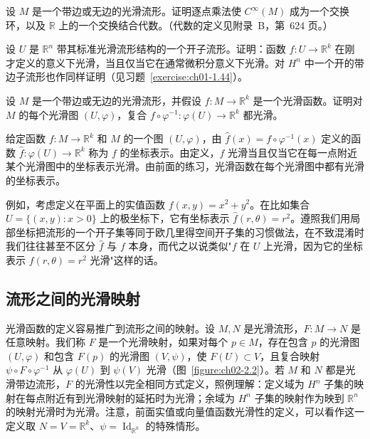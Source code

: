 \documentclass[../../main.tex]{subfiles}
\begin{document}
\begin{exercise}\label{exercise:ch02-2.1}
设 $M$ 是一个带边或无边的光滑流形。证明逐点乘法使 $C^{\infty}(M)$ 成为一个交换环，以及 $\mathbb{R}$ 上的一个交换结合代数。（代数的定义见附录~B，第~624 页。）
\end{exercise}

\begin{exercise}\label{exercise:ch02-2.2}
设 $U$ 是 $\mathbb{R}^{n}$ 带其标准光滑流形结构的一个开子流形。证明：函数 $f:U\to\mathbb{R}^{k}$ 在刚才定义的意义下光滑，当且仅当它在通常微积分意义下光滑。对 $H^{n}$ 中一个开的带边子流形也作同样证明（见习题~\cref{exercise:ch01-1.44}）。
\end{exercise}

\begin{exercise}\label{exercise:ch02-2.3}
设 $M$ 是一个带边或无边的光滑流形，并假设 $f:M\to\mathbb{R}^{k}$ 是一个光滑函数。证明对 $M$ 的每个光滑图 $(U,\varphi)$，复合 $f\circ\varphi^{-1}:\varphi(U)\to\mathbb{R}^{k}$ 都光滑。
\end{exercise}

给定函数 $f:M\to\mathbb{R}^{k}$ 和 $M$ 的一个图 $(U,\varphi)$，由 $\widehat{f}(x)=f\circ\varphi^{-1}(x)$ 定义的函数 $\widehat{f}:\varphi(U)\to\mathbb{R}^{k}$ 称为 $f$ 的坐标表示。由定义，$f$ 光滑当且仅当它在每一点附近某个光滑图中的坐标表示光滑。由前面的练习，光滑函数在每个光滑图中都有光滑的坐标表示。

例如，考虑定义在平面上的实值函数 $f(x,y)=x^{2}+y^{2}$。在比如集合 $U=\{(x,y):x>0\}$ 上的极坐标下，它有坐标表示 $\widehat{f}(r,\theta)=r^{2}$。遵照我们用局部坐标把流形的一个开子集等同于欧几里得空间开子集的习惯做法，在不致混淆时我们往往甚至不区分 $\widehat{f}$ 与 $f$ 本身，而代之以说类似"$f$ 在 $U$ 上光滑，因为它的坐标表示 $f(r,\theta)=r^{2}$ 光滑"这样的话。
\subsection{流形之间的光滑映射}\label{subsection:ch02-流形之间的光滑映射}

光滑函数的定义容易推广到流形之间的映射。设 $M,N$ 是光滑流形，$F:M\to N$ 是任意映射。我们称 $F$ 是一个光滑映射，如果对每个 $p\in M$，存在包含 $p$ 的光滑图 $(U,\varphi)$ 和包含 $F(p)$ 的光滑图 $(V,\psi)$，使 $F(U)\subset V$，且复合映射 $\psi\circ F\circ\varphi^{-1}$ 从 $\varphi(U)$ 到 $\psi(V)$ 光滑（图~\cref{figure:ch02-2.2}）。若 $M$ 和 $N$ 都是光滑带边流形，$F$ 的光滑性以完全相同方式定义，照例理解：定义域为 $H^{n}$ 子集的映射在每点附近有到光滑映射的延拓时为光滑；余域为 $H^{n}$ 子集的映射作为映到 $\mathbb{R}^{n}$ 的映射光滑时为光滑。注意，前面实值或向量值函数光滑性的定义，可以看作这一定义取 $N=V=\mathbb{R}^{k}$、$\psi=\operatorname{Id}_{\mathbb{R}^{k}}$ 的特殊情形。
\end{document}
